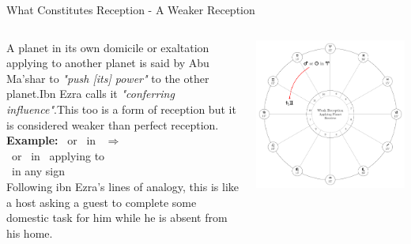 \begin{frame}[t]{What Constitutes Reception - A Weaker Reception}
\begin{columns}[T, onlytextwidth]
A planet in its own domicile or exaltation applying to another planet is said by Abu Ma'shar to \textsl{"push [its] power"} to the other planet.\footnotemark[1] Ibn Ezra calls it \textsl{"conferring influence"}.\footnotemark[2]This too is a form of reception but it is considered weaker than perfect reception.\\
\vspace{0.2cm}
\textbf{Example:} \Mars\ or \Sun\ in \Aries\ $\Rightarrow$  \Saturn \\
\ul
\vspace{0.2cm}
\Mars\ or \Sun\ in \Aries\ applying to  \\
\Saturn\ in any sign \\
\vspace{0.2cm}
Following ibn Ezra's lines of analogy, this is like a host asking a guest to complete some domestic task for him while he is absent from his home.

\vspace{-0.5cm}
\begin{center}
{\includegraphics[width=\textwidth]{charts/01-weaker-reception}} \\
\end{center}

\end{columns}
\vspace{0.2cm}
\end{frame}
